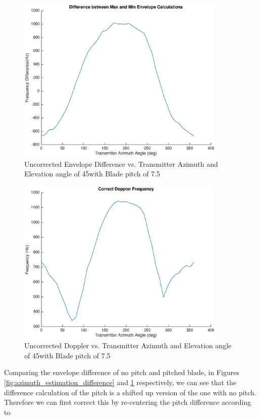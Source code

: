 \begin{figure}
	\begin{center}
		\includegraphics[width=10cm]{images/results/difference_pitch_noCorrection.eps}
		\caption{Uncorrected Envelope Difference vs. Transmitter Azimuth and Elevation angle of 45\textdegree with Blade pitch of 7.5\textdegree}
		\label{fig:diff_pitch_noCorrection}
	\end{center}
\end{figure}

\begin{figure}
	\begin{center}
		\includegraphics[width=10cm]{images/results/correct_dop_pitch_noCorrection.eps}
		\caption{Uncorrected Doppler vs. Transmitter Azimuth and Elevation angle of 45\textdegree with Blade pitch of 7.5\textdegree}
		\label{fig:dop_pitch_noCorrection}
	\end{center}
\end{figure}

Comparing the envelope difference of no pitch and pitched blade, in Figures \ref{fig:azimuth_estimation_difference} and \ref{fig:diff_pitch_noCorrection} respectively, we can see that the difference calculation of the pitch is a shifted up version of the one with no pitch. Therefore we can first correct this by re-centering the pitch difference according to 

